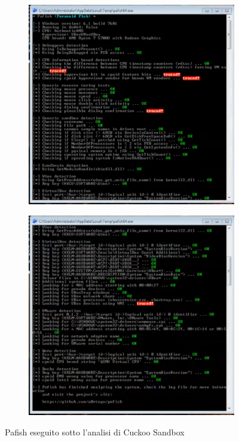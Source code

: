 \begin{figure}[htbp]
\centering
\begin{subfigure}{.5\textwidth}
  \centering
  \includegraphics[width=.9\linewidth]{assets/pafish_cuckoo_1.png}
\end{subfigure}%
\begin{subfigure}{.5\textwidth}
  \centering
  \includegraphics[width=.9\linewidth]{assets/pafish_cuckoo_2.png}
\end{subfigure}
\caption{Pafish eseguito sotto l'analisi di Cuckoo Sandbox}
\label{fig:pafish_cuckoo}
\end{figure}

